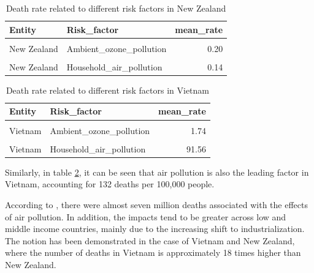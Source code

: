 \documentclass[11pt,a4paper,]{article}
\begin{document}
\begin{table}[!h]

\caption{\label{tab:nz}Death rate related to different risk factors in New Zealand}
\centering
\begin{tabular}[t]{llr}
\toprule
Entity & Risk\_factor & mean\_rate\\
\midrule
\cellcolor{gray!6}{New Zealand} & \cellcolor{gray!6}{Air\_pollution} & \cellcolor{gray!6}{7.11}\\
New Zealand & Ambient\_ozone\_pollution & 0.20\\
\cellcolor{gray!6}{New Zealand} & \cellcolor{gray!6}{Ambient\_particulate\_matter\_pollution} & \cellcolor{gray!6}{6.77}\\
New Zealand & Household\_air\_pollution & 0.14\\
\bottomrule
\end{tabular}
\end{table}

\begin{table}[!h]

\caption{\label{tab:vn}Death rate related to different risk factors in Vietnam}
\centering
\begin{tabular}[t]{llr}
\toprule
Entity & Risk\_factor & mean\_rate\\
\midrule
\cellcolor{gray!6}{Vietnam} & \cellcolor{gray!6}{Air\_pollution} & \cellcolor{gray!6}{131.61}\\
Vietnam & Ambient\_ozone\_pollution & 1.74\\
\cellcolor{gray!6}{Vietnam} & \cellcolor{gray!6}{Ambient\_particulate\_matter\_pollution} & \cellcolor{gray!6}{38.99}\\
Vietnam & Household\_air\_pollution & 91.56\\
\bottomrule
\end{tabular}
\end{table}

Similarly, in table \ref{tab:vn}, it can be seen that air pollution is also the leading factor in Vietnam, accounting for 132 deaths per 100,000 people.

According to \textcite{mannucci2017health}, there were almost seven million deaths associated with the effects of air pollution. In addition, the impacts tend to be greater across low and middle income countries, mainly due to the increasing shift to industrialization. The notion has been demonstrated in the case of Vietnam and New Zealand, where the number of deaths in Vietnam is approximately 18 times higher than New Zealand.
\end{document}
